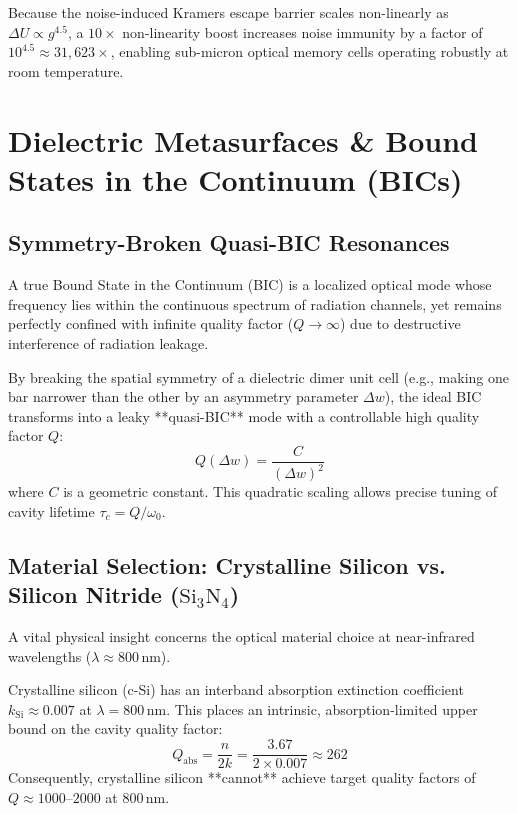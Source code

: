 \documentclass[11pt,oneside]{article}
\begin{document}
Because the noise-induced Kramers escape barrier scales non-linearly as $\Delta U \propto g^{4.5}$, a $10\times$ non-linearity boost increases noise immunity by a factor of $10^{4.5} \approx 31{,}623\times$, enabling sub-micron optical memory cells operating robustly at room temperature.

\section{Dielectric Metasurfaces \& Bound States in the Continuum (BICs)}
\label{sec:metasurfaces}

\subsection{Symmetry-Broken Quasi-BIC Resonances}

A true Bound State in the Continuum (BIC) is a localized optical mode whose frequency lies within the continuous spectrum of radiation channels, yet remains perfectly confined with infinite quality factor ($Q \to \infty$) due to destructive interference of radiation leakage.

By breaking the spatial symmetry of a dielectric dimer unit cell (e.g., making one bar narrower than the other by an asymmetry parameter $\Delta w$), the ideal BIC transforms into a leaky **quasi-BIC** mode with a controllable high quality factor $Q$:
\begin{equation}
Q(\Delta w) = \frac{C}{(\Delta w)^2}
\label{eq:q_scaling}
\end{equation}
where $C$ is a geometric constant. This quadratic scaling allows precise tuning of cavity lifetime $\tau_c = Q / \omega_0$.

\subsection{Material Selection: Crystalline Silicon vs. Silicon Nitride ($\text{Si}_3\text{N}_4$)}

A vital physical insight concerns the optical material choice at near-infrared wavelengths ($\lambda \approx 800\,\text{nm}$).

Crystalline silicon (c-Si) has an interband absorption extinction coefficient $k_{\text{Si}} \approx 0.007$ at $\lambda = 800\,\text{nm}$. This places an intrinsic, absorption-limited upper bound on the cavity quality factor:
\begin{equation}
Q_{\text{abs}} = \frac{n}{2k} = \frac{3.67}{2 \times 0.007} \approx 262
\end{equation}
Consequently, crystalline silicon **cannot** achieve target quality factors of $Q \approx 1000$--$2000$ at $800\,\text{nm}$.
\end{document}
